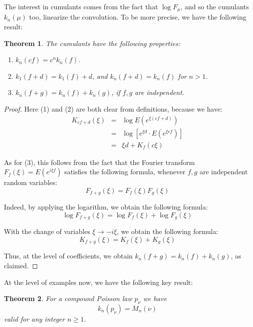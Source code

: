 \documentclass[12pt]{amsbook}
\newtheorem{theorem}{Theorem}[chapter]
\begin{document}
The interest in cumulants comes from the fact that $\log F_\mu$, and so the cumulants $k_n(\mu)$ too, linearize the convolution. To be more precise, we have the following result:

\begin{theorem}
The cumulants have the following properties:
\begin{enumerate}
\item $k_n(cf)=c^nk_n(f)$.

\item $k_1(f+d)=k_1(f)+d$, and $k_n(f+d)=k_n(f)$ for $n>1$.

\item $k_n(f+g)=k_n(f)+k_n(g)$, if $f,g$ are independent.
\end{enumerate}
\end{theorem}

\begin{proof}
Here (1) and (2) are both clear from definitions, because we have:
\begin{eqnarray*}
K_{cf+d}(\xi)
&=&\log E(e^{\xi(cf+d)})\\
&=&\log[e^{\xi d}\cdot E(e^{\xi cf})]\\
&=&\xi d+K_f(c\xi)
\end{eqnarray*}

As for (3), this follows from the fact that the Fourier transform $F_f(\xi)=E(e^{i\xi f})$ satisfies the following formula, whenever $f,g$ are independent random variables:
$$F_{f+g}(\xi)=F_f(\xi)F_g(\xi)$$

Indeed, by applying the logarithm, we obtain the following formula:
$$\log F_{f+g}(\xi)=\log F_f(\xi)+\log F_g(\xi)$$

With the change of variables $\xi\to-i\xi$, we obtain the following formula:
$$K_{f+g}(\xi)=K_f(\xi)+K_g(\xi)$$

Thus, at the level of coefficients, we obtain $k_n(f+g)=k_n(f)+k_n(g)$, as claimed.
\end{proof}

At the level of examples now, we have the following key result:

\begin{theorem}
For a compound Poisson law $p_\nu$ we have
$$k_n(p_\nu)=M_n(\nu)$$
valid for any integer $n\geq1$.
\end{theorem}
\end{document}
